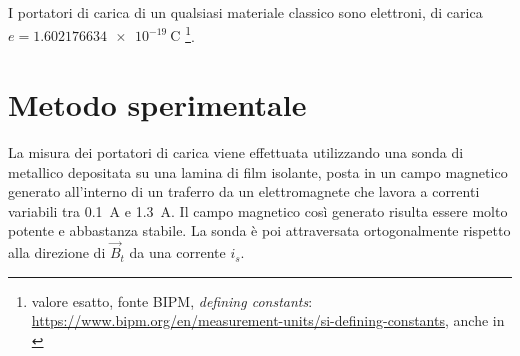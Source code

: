 \documentclass[
    prl,
    reprint, 
    superscriptaddress, 
    altaffilletter, 
    amsmath, 
    amssymb, 
    a4paper,
    varvw]{revtex4-2}
\begin{document}
I portatori di carica di un qualsiasi materiale classico sono elettroni, di carica $e=\SI{1.602176634e-19}{\coulomb}$ \footnote{valore esatto, fonte BIPM, \emph{defining constants}: \url{https://www.bipm.org/en/measurement-units/si-defining-constants}, anche in \cite{Newell_2018}}. 

\section{Metodo sperimentale}
La misura dei portatori di carica viene effettuata utilizzando una sonda di  metallico depositata su una lamina di film isolante, posta in un campo magnetico generato all'interno di un traferro da un elettromagnete che lavora a correnti variabili tra \SI{0.1}{\ampere} e \SI{1.3}{\ampere}. Il campo magnetico così generato risulta essere molto potente e abbastanza stabile. La sonda è poi attraversata ortogonalmente rispetto alla direzione di $\vec{B}_t$ da una corrente $i_s$. 


\appendix

\setcounter{table}{0}
\renewcommand{\thetable}{A-\Roman{table}}

%

\end{document}
